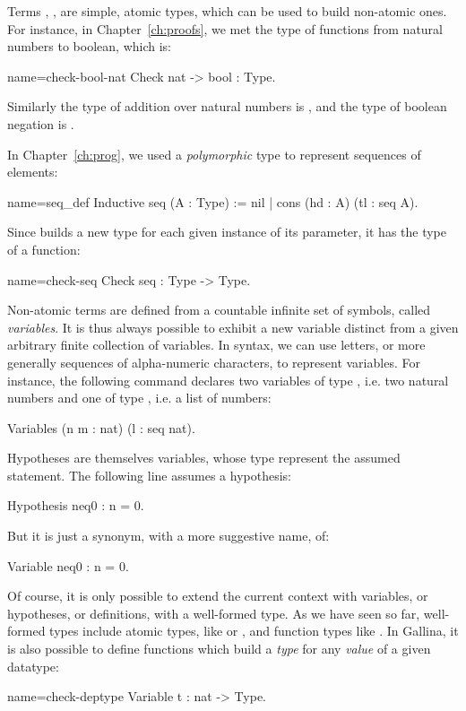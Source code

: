 Terms , ,  are simple, atomic types, which can be used
to build non-atomic ones. For instance, in Chapter~\ref{ch:proofs}, we
met the type of functions from natural numbers to boolean, which is:

\begin{coq}{name=check-bool-nat}{}
Check nat -> bool : Type.
\end{coq}

Similarly the type of addition over natural numbers is 
, and the type of boolean negation is 
.

In Chapter~\ref{ch:prog}, we used a \emph{polymorphic} type to represent
sequences of elements:

\begin{coq}{name=seq_def}{}
Inductive seq (A : Type) := nil | cons (hd : A) (tl : seq A).
\end{coq}

Since  builds a new type for each given instance of its
parameter, it has the type of a function:

\begin{coq}{name=check-seq}{}
Check seq : Type -> Type.
\end{coq}

Non-atomic terms are defined from a countable infinite set of
symbols, called  \emph{variables}.
It is thus always possible to exhibit a new variable
distinct from a given arbitrary finite collection of variables. In \Coq{}
syntax, we can use letters, or more generally sequences of
alpha-numeric characters, to represent variables. For instance, the
following command declares two variables of type , i.e. two
natural numbers and one of type , i.e. a list of numbers:

\begin{coq}{}{}
Variables (n m : nat) (l : seq nat).
\end{coq}

Hypotheses are themselves variables, whose type represent the
assumed statement. The following line assumes a hypothesis:

\begin{coq}{}{}
Hypothesis neq0 : n = 0.
\end{coq}
But it is just a synonym, with a more suggestive name, of:
\begin{coq}{}{}
Variable neq0 : n = 0.
\end{coq}

Of course, it is only possible to extend the current context with variables, or
hypotheses, or definitions, with a well-formed type. As we have seen
so far, well-formed types include atomic types, like  or
, and function types like . In Gallina, it is
also possible to define functions which build a \emph{type} for any
\emph{value} of a given datatype:
\begin{coq}{name=check-deptype}{}
Variable t : nat -> Type.
\end{coq}

